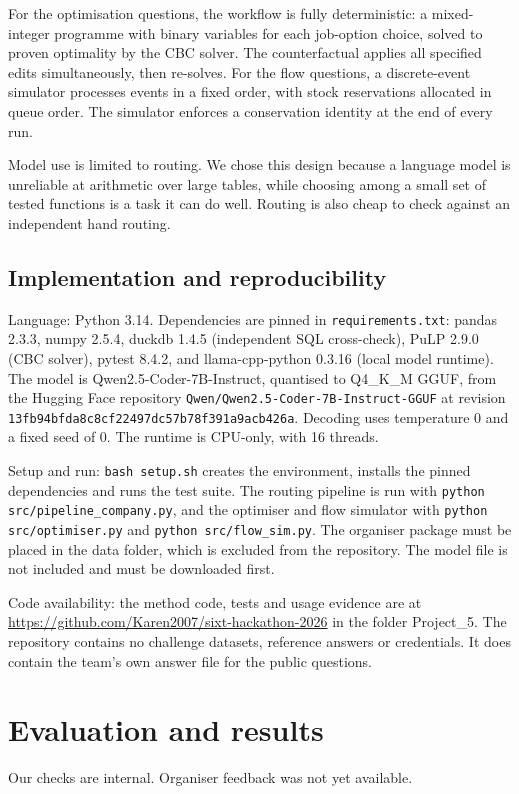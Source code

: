 \documentclass[11pt,a4paper]{article}
\begin{document}
For the optimisation questions, the workflow is fully deterministic: a
mixed-integer programme with binary variables for each job-option choice, solved
to proven optimality by the CBC solver. The counterfactual applies all specified
edits simultaneously, then re-solves. For the flow questions, a discrete-event
simulator processes events in a fixed order, with stock reservations allocated
in queue order. The simulator enforces a conservation identity at the end of
every run.

Model use is limited to routing. We chose this design because a language model
is unreliable at arithmetic over large tables, while choosing among a small set
of tested functions is a task it can do well. Routing is also cheap to check
against an independent hand routing.

\subsection{Implementation and reproducibility}
Language: Python 3.14. Dependencies are pinned in \texttt{requirements.txt}:
pandas 2.3.3, numpy 2.5.4, duckdb 1.4.5 (independent SQL cross-check), PuLP 2.9.0
(CBC solver), pytest 8.4.2, and llama-cpp-python 0.3.16 (local model runtime).
The model is Qwen2.5-Coder-7B-Instruct, quantised to Q4\_K\_M GGUF, from the
Hugging Face repository \nolinkurl{Qwen/Qwen2.5-Coder-7B-Instruct-GGUF} at revision
\nolinkurl{13fb94bfda8c8cf22497dc57b78f391a9acb426a}. Decoding uses temperature
0 and a fixed seed of 0. The runtime is CPU-only, with 16 threads.

Setup and run: \texttt{bash setup.sh} creates the environment, installs the
pinned dependencies and runs the test suite. The routing pipeline is run with
\texttt{python src/pipeline\_company.py}, and the optimiser and flow simulator
with \texttt{python src/optimiser.py} and \texttt{python src/flow\_sim.py}. The
organiser package must be placed in the data folder, which is excluded from the
repository. The model file is not included and must be downloaded first.

Code availability: the method code, tests and usage evidence are at
\url{https://github.com/Karen2007/sixt-hackathon-2026} in the folder Project\_5. The
repository contains no challenge datasets, reference answers or credentials. It does contain
the team's own answer file for the public questions.

\section{Evaluation and results}
Our checks are internal. Organiser feedback was not yet available.
\end{document}
